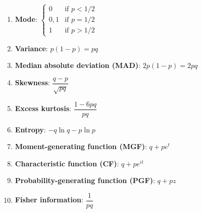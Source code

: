 \begin{enumerate}
    \item \textbf{Mode}:
    $
         {\displaystyle {\begin{cases}0&{\text{if }}p<1/2\\0,1&{\text{if }}p=1/2\\1&{\text{if }}p>1/2\end{cases}}}
    $
    \hfill \cite{wiki/Bernoulli_distribution}

    \item \textbf{Variance}:
    $
         {\displaystyle p(1-p)=pq}
    $
    \hfill \cite{wiki/Bernoulli_distribution}

    \item \textbf{Median absolute deviation (MAD)}:
    $
         {\displaystyle 2p(1-p)=2pq}
    $
    \hfill \cite{wiki/Bernoulli_distribution}

    \item \textbf{Skewness}:
    $
         {\displaystyle {\dfrac {q-p}{\sqrt {pq}}}}
    $
    \hfill \cite{wiki/Bernoulli_distribution}

    \item \textbf{Excess kurtosis}:
    $
         {\displaystyle {\dfrac {1-6pq}{pq}}}
    $
    \hfill \cite{wiki/Bernoulli_distribution}

    \item \textbf{Entropy}:
    $
         {\displaystyle -q\ln q-p\ln p}
    $
    \hfill \cite{wiki/Bernoulli_distribution}

    \item \textbf{Moment-generating function (MGF)}:
    $
         {\displaystyle q+pe^{t}}
    $
    \hfill \cite{wiki/Bernoulli_distribution}

    \item \textbf{Characteristic function (CF)}:
    $
         {\displaystyle q+pe^{it}}
    $
    \hfill \cite{wiki/Bernoulli_distribution}

    \item \textbf{Probability-generating function (PGF)}:
    $
         {\displaystyle q+pz}
    $
    \hfill \cite{wiki/Bernoulli_distribution}

    \item \textbf{Fisher information}:
    $
         {\displaystyle {\dfrac {1}{pq}}}
    $
    \hfill \cite{wiki/Bernoulli_distribution}
\end{enumerate}





